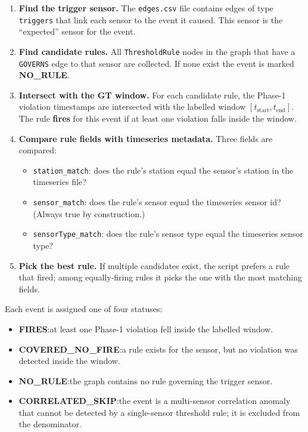 ﻿\documentclass[11pt]{article}
\begin{document}
\begin{enumerate}
  \item \textbf{Find the trigger sensor.} The \texttt{edges.csv} file contains
        edges of type \texttt{triggers} that link each sensor to the event it
        caused.  This sensor is the ``expected'' sensor for the event.

  \item \textbf{Find candidate rules.} All \texttt{ThresholdRule} nodes in
        the graph that have a \texttt{GOVERNS} edge to that sensor are
        collected.  If none exist the event is marked \textbf{NO\_RULE}.

  \item \textbf{Intersect with the GT window.} For each candidate rule, the
        Phase-1 violation timestamps are intersected with the labelled window
        $[t_{\text{start}}, t_{\text{end}}]$.  The rule \textbf{fires} for
        this event if at least one violation falls inside the window.

  \item \textbf{Compare rule fields with timeseries metadata.}
        Three fields are compared:
        \begin{itemize}
          \item \texttt{station\_match}: does the rule's station equal the
                sensor's station in the timeseries file?
          \item \texttt{sensor\_match}: does the rule's sensor equal the
                timeseries sensor id?  (Always true by construction.)
          \item \texttt{sensorType\_match}: does the rule's sensor type equal
                the timeseries sensor type?
        \end{itemize}

  \item \textbf{Pick the best rule.} If multiple candidates exist, the
        script prefers a rule that fired; among equally-firing rules it picks
        the one with the most matching fields.
\end{enumerate}

Each event is assigned one of four statuses:
\begin{itemize}
  \item \textbf{FIRES}:at least one Phase-1 violation fell inside the
        labelled window.
  \item \textbf{COVERED\_NO\_FIRE}:a rule exists for the sensor, but no
        violation was detected inside the window.
  \item \textbf{NO\_RULE}:the graph contains no rule governing the trigger
        sensor.
  \item \textbf{CORRELATED\_SKIP}:the event is a multi-sensor correlation
        anomaly that cannot be detected by a single-sensor threshold rule; it
        is excluded from the denominator.
\end{itemize}
\end{document}
